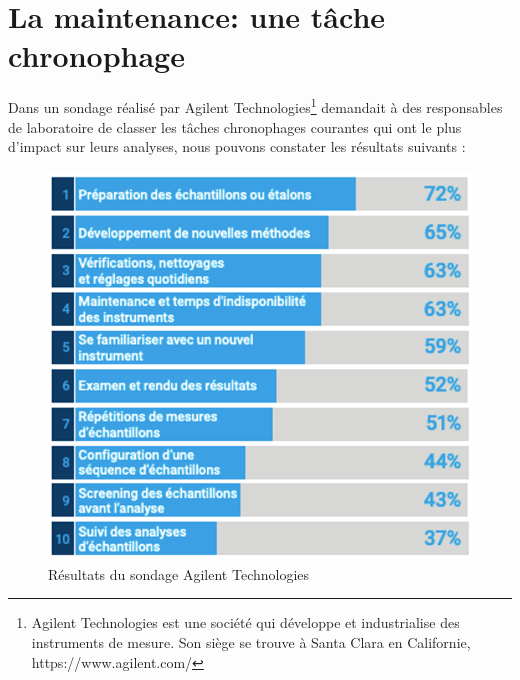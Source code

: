 \section{La maintenance: une tâche chronophage}
Dans un sondage réalisé par Agilent Technologies\footnote[1]{Agilent Technologies est une société 
qui développe et industrialise des instruments de mesure. Son siège se trouve à Santa Clara en 
Californie, https://www.agilent.com/}  demandait à des responsables de laboratoire de classer 
les tâches chronophages courantes qui ont le plus d’impact sur leurs analyses, nous pouvons 
constater les résultats suivants :
\begin{figure}[hp]
    \centering
    \includegraphics[scale=1]{images/sondage_chronophage.png}
    \caption{Résultats du sondage Agilent Technologies}
\end{figure}

